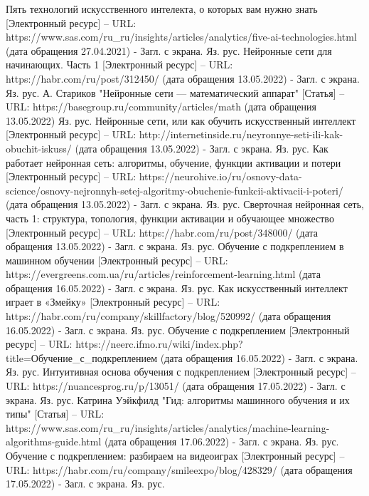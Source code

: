 \documentclass[bachelor, och, coursework]{shiza}
\begin{document}
\begin{thebibliography}{3}
    Пять технологий искусственного интелекта, о которых вам нужно знать [Электронный ресурс] – URL: https://www.sas.com/ru_ru/insights/articles/analytics/five-ai-technologies.html (дата обращения 27.04.2021) - Загл. с экрана. Яз. рус.
    Нейронные сети для начинающих. Часть 1 [Электронный ресурс] – URL: https://habr.com/ru/post/312450/ (дата обращения 13.05.2022) - Загл. с экрана. Яз. рус.
    А. Стариков "Нейронные сети — математический аппарат" [Статья] – URL: https://basegroup.ru/community/articles/math (дата обращения 13.05.2022) Яз. рус.
    Нейронные сети, или как обучить искусственный интеллект [Электронный ресурс] – URL: http://internetinside.ru/neyronnye-seti-ili-kak-obuchit-iskuss/ (дата обращения 13.05.2022) - Загл. с экрана. Яз. рус.
    Как работает нейронная сеть: алгоритмы, обучение, функции активации и потери [Электронный ресурс] – URL: https://neurohive.io/ru/osnovy-data-science/osnovy-nejronnyh-setej-algoritmy-obuchenie-funkcii-aktivacii-i-poteri/ (дата обращения 13.05.2022) - Загл. с экрана. Яз. рус.
    Сверточная нейронная сеть, часть 1: структура, топология, функции активации и обучающее множество [Электронный ресурс] – URL: https://habr.com/ru/post/348000/ (дата обращения 13.05.2022) - Загл. с экрана. Яз. рус.
    Обучение с подкреплением в машинном обучении [Электронный ресурс] – URL: https://evergreens.com.ua/ru/articles/reinforcement-learning.html (дата обращения 16.05.2022) - Загл. с экрана. Яз. рус.
    Как искусственный интеллект играет в «Змейку» [Электронный ресурс] – URL: https://habr.com/ru/company/skillfactory/blog/520992/ (дата обращения 16.05.2022) - Загл. с экрана. Яз. рус.
    Обучение с подкреплением [Электронный ресурс] – URL: https://neerc.ifmo.ru/wiki/index.php?title=Обучение_с_подкреплением (дата обращения 16.05.2022) - Загл. с экрана. Яз. рус.
    Интуитивная основа обучения с подкреплением [Электронный ресурс] – URL: https://nuancesprog.ru/p/13051/ (дата обращения 17.05.2022) - Загл. с экрана. Яз. рус.
    Катрина Уэйкфилд "Гид: алгоритмы машинного обучения и их типы" [Статья] – URL: https://www.sas.com/ru_ru/insights/articles/analytics/machine-learning-algorithms-guide.html (дата обращения 17.06.2022) - Загл. с экрана. Яз. рус.
    Обучение с подкреплением: разбираем на видеоиграх [Электронный ресурс] – URL: https://habr.com/ru/company/smileexpo/blog/428329/ (дата обращения 17.05.2022) - Загл. с экрана. Яз. рус.

\end{thebibliography}
\end{document}
